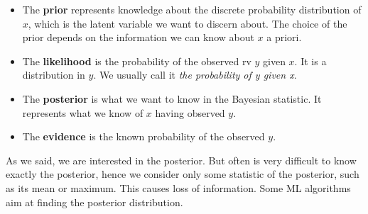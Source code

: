 \begin{itemize}
    \item The \textbf{prior} represents knowledge about the discrete probability distribution of $x$, which is the latent variable we want to discern about. The choice of the prior depends on the information we can know about $x$ a priori.
    \item The \textbf{likelihood} is the probability of the observed rv $y$ given $x$. It is a distribution in $y$. We usually call it \textit{the probability of y given x}.
    \item The \textbf{posterior} is what we want to know in the Bayesian statistic. It represents what we know of $x$ having observed $y$.
    \item The \textbf{evidence} is the known probability of the observed  $y$.
\end{itemize}

As we said, we are interested in the posterior. But often is very difficult to know exactly the posterior, hence we consider only some statistic of the posterior, such as its mean or maximum. This causes loss of information. Some ML algorithms aim at finding the posterior distribution.



  
  
  

